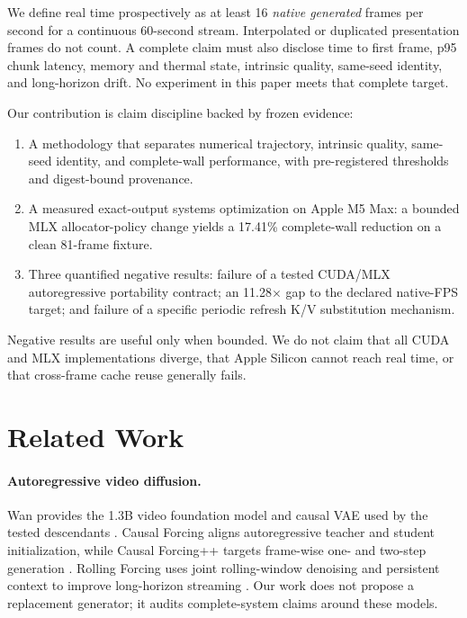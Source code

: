 \documentclass[10pt,twocolumn]{article}
\begin{document}
We define real time prospectively as at least 16 \emph{native generated} frames per second for a continuous 60-second stream. Interpolated or duplicated presentation frames do not count. A complete claim must also disclose time to first frame, p95 chunk latency, memory and thermal state, intrinsic quality, same-seed identity, and long-horizon drift. No experiment in this paper meets that complete target.

Our contribution is claim discipline backed by frozen evidence:
\begin{enumerate}[leftmargin=*,itemsep=2pt]
  \item A methodology that separates numerical trajectory, intrinsic quality, same-seed identity, and complete-wall performance, with pre-registered thresholds and digest-bound provenance.
  \item A measured exact-output systems optimization on Apple M5 Max: a bounded MLX allocator-policy change yields a 17.41\% complete-wall reduction on a clean 81-frame fixture.
  \item Three quantified negative results: failure of a tested CUDA/MLX autoregressive portability contract; an 11.28$\times$ gap to the declared native-FPS target; and failure of a specific periodic refresh K/V substitution mechanism.
\end{enumerate}

Negative results are useful only when bounded. We do not claim that all CUDA and MLX implementations diverge, that Apple Silicon cannot reach real time, or that cross-frame cache reuse generally fails.

\section{Related Work}
\paragraph{Autoregressive video diffusion.}
Wan provides the 1.3B video foundation model and causal VAE used by the tested descendants \cite{wan}. Causal Forcing aligns autoregressive teacher and student initialization, while Causal Forcing++ targets frame-wise one- and two-step generation \cite{causalforcing,causalforcingpp}. Rolling Forcing uses joint rolling-window denoising and persistent context to improve long-horizon streaming \cite{rollingforcing}. Our work does not propose a replacement generator; it audits complete-system claims around these models.
\end{document}
